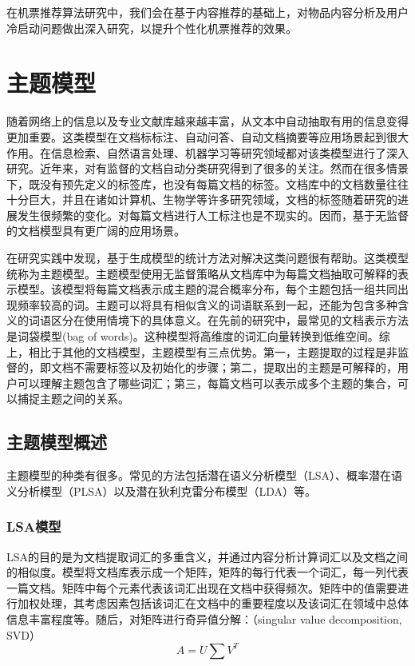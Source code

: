 在机票推荐算法研究中，我们会在基于内容推荐的基础上，对物品内容分析及用户冷启动问题做出深入研究，以提升个性化机票推荐的效果。

\section{主题模型}


随着网络上的信息以及专业文献库越来越丰富，从文本中自动抽取有用的信息变得更加重要。这类模型在文档标标注、自动问答、自动文档摘要等应用场景起到很大作用。在信息检索、自然语言处理、机器学习等研究领域都对该类模型进行了深入研究。近年来，对有监督的文档自动分类研究得到了很多的关注。然而在很多情景下，既没有预先定义的标签库，也没有每篇文档的标签。文档库中的文档数量往往十分巨大，并且在诸如计算机、生物学等许多研究领域，文档的标签随着研究的进展发生很频繁的变化。对每篇文档进行人工标注也是不现实的。因而，基于无监督的文档模型具有更广阔的应用场景。

在研究实践中发现，基于生成模型的统计方法对解决这类问题很有帮助。这类模型统称为主题模型。主题模型使用无监督策略从文档库中为每篇文档抽取可解释的表示模型。该模型将每篇文档表示成主题的混合概率分布，每个主题包括一组共同出现频率较高的词。主题可以将具有相似含义的词语联系到一起，还能为包含多种含义的词语区分在使用情境下的具体意义。在先前的研究中，最常见的文档表示方法是词袋模型(bag of words)。这种模型将高维度的词汇向量转换到低维空间。综上，相比于其他的文档模型，主题模型有三点优势。第一，主题提取的过程是非监督的，即文档不需要标签以及初始化的步骤；第二，提取出的主题是可解释的，用户可以理解主题包含了哪些词汇；第三，每篇文档可以表示成多个主题的集合，可以捕捉主题之间的关系。


\subsection{主题模型概述}

主题模型的种类有很多。常见的方法包括潜在语义分析模型（LSA）、概率潜在语义分析模型（PLSA）以及潜在狄利克雷分布模型（LDA）等。

\subsubsection{LSA模型}
LSA的目的是为文档提取词汇的多重含义，并通过内容分析计算词汇以及文档之间的相似度。模型将文档库表示成一个矩阵，矩阵的每行代表一个词汇，每一列代表一篇文档。矩阵中每个元素代表该词汇出现在文档中获得频次。矩阵中的值需要进行加权处理，其考虑因素包括该词汇在文档中的重要程度以及该词汇在领域中总体信息丰富程度等。随后，对矩阵进行奇异值分解：（singular value decomposition, SVD）
\begin{equation}
	A = U\sum V^T
\end{equation}

